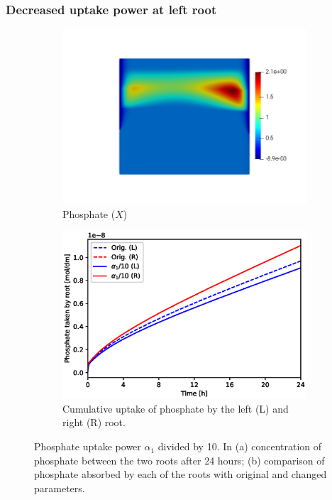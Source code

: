 \documentclass[11pt]{article}
\begin{document}
\FloatBarrier
\subsubsection{Decreased uptake power at left root}
\begin{figure}[!htb]
\centering
\begin{subfigure}[t]{0.45\textwidth}
    \includegraphics[trim= 100 100 60 100,width=\textwidth]{Figures/X_alpha1divby10.png}
    \caption{Phosphate ($X$)}
\end{subfigure}
\qquad
\begin{subfigure}[t]{0.45\textwidth}
    \includegraphics[width=\textwidth]{Figures/alpha1divby10.eps}
    \caption{Cumulative uptake of phosphate by the left (L) and right (R) root.}
\end{subfigure}

\caption{Phosphate uptake power $\alpha_1$ divided by 10. In (a) concentration of phosphate between the two roots after 24 hours; (b) comparison of phosphate absorbed by each of the roots with original and changed parameters.}
\end{figure}
\end{document}

